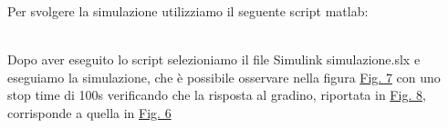 Per svolgere la simulazione utilizziamo il seguente script matlab: 
\begin{scriptsize}

\end{scriptsize}
\\ 
Dopo aver eseguito lo script selezioniamo il file Simulink simulazione.slx e eseguiamo la simulazione, che è possibile osservare nella figura \hyperref[fig:simulink]{Fig. 7} con uno stop time di 100s verificando che la risposta al gradino, riportata in \hyperref[fig:fig8]{Fig. 8}, corrisponde a quella in \hyperref[fig:fig6]{Fig. 6}